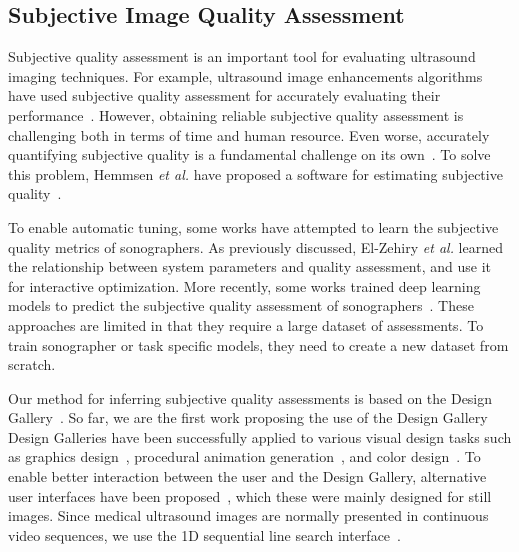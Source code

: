 \subsection{Subjective Image Quality Assessment}
Subjective quality assessment is an important tool for evaluating ultrasound imaging techniques.
For example, ultrasound image enhancements algorithms have used subjective quality assessment for accurately evaluating their performance~\cite{loizou_quality_2006, hemmsen_ultrasound_2010, wong_monte_2012, kang_new_2016, mishra_edge_2018}.
However, obtaining reliable subjective quality assessment is challenging both in terms of time and human resource.
Even worse, accurately quantifying subjective quality is a fundamental challenge on its own~\cite{streijl_mean_2016}.
To solve this problem, Hemmsen \textit{et al.} have proposed a software for estimating subjective quality~\cite{hemmsen_ultrasound_2010}.

To enable automatic tuning, some works have attempted to learn the subjective quality metrics of sonographers.
As previously discussed, El-Zehiry \textit{et al.} learned the relationship between system parameters and quality assessment, and use it for interactive optimization.
More recently, some works trained deep learning models to predict the subjective quality assessment of sonographers~\cite{abdi_automatic_2017, annangi_ai_2020}.
These approaches are limited in that they require a large dataset of assessments.
To train sonographer or task specific models, they need to create a new dataset from scratch.

Our method for inferring subjective quality assessments is based on the Design Gallery~\cite{10.1145/258734.258887}.
So far, we are the first work proposing the use of the Design Gallery 
Design Galleries have been successfully applied to various visual design tasks such as graphics design~\cite{10.1145/258734.258887}, procedural animation generation~\cite{brochu_bayesian_2010}, and color design~\cite{phan_color_2018}.
To enable better interaction between the user and the Design Gallery, alternative user interfaces have been proposed~\cite{phan_color_2018, 10.1145/3072959.3073598, koyama_sequential_2020}, which these were mainly designed for still images.
Since medical ultrasound images are normally presented in continuous video sequences, we use the 1D sequential line search interface~\cite{10.1145/3072959.3073598}.



